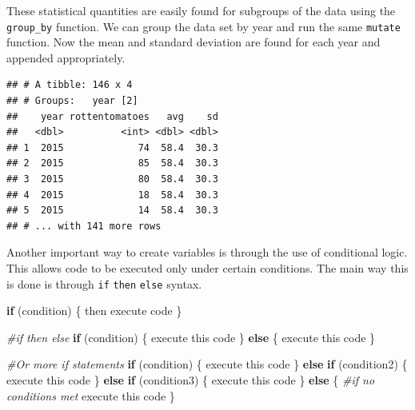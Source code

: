 \documentclass[
]{book}
\newenvironment{Shaded}{\begin{snugshade}}{\end{snugshade}}
\newcommand{\CommentTok}[1]{\textcolor[rgb]{0.56,0.35,0.01}{\textit{#1}}}
\newcommand{\ControlFlowTok}[1]{\textcolor[rgb]{0.13,0.29,0.53}{\textbf{#1}}}
\newcommand{\DataTypeTok}[1]{\textcolor[rgb]{0.13,0.29,0.53}{#1}}
\newcommand{\KeywordTok}[1]{\textcolor[rgb]{0.13,0.29,0.53}{\textbf{#1}}}
\newcommand{\NormalTok}[1]{#1}
\newcommand{\OperatorTok}[1]{\textcolor[rgb]{0.81,0.36,0.00}{\textbf{#1}}}
\newcommand{\StringTok}[1]{\textcolor[rgb]{0.31,0.60,0.02}{#1}}
\theoremstyle{definition}
\theoremstyle{definition}
\theoremstyle{definition}
\theoremstyle{remark}
\begin{document}
These statistical quantities are easily found for subgroups of the data using the \texttt{group\_by} function. We can group the data set by year and run the same \texttt{mutate} function. Now the mean and standard deviation are found for each year and appended appropriately.

\begin{Shaded}
\end{Shaded}

\begin{verbatim}
## # A tibble: 146 x 4
## # Groups:   year [2]
##    year rottentomatoes   avg    sd
##   <dbl>          <int> <dbl> <dbl>
## 1  2015             74  58.4  30.3
## 2  2015             85  58.4  30.3
## 3  2015             80  58.4  30.3
## 4  2015             18  58.4  30.3
## 5  2015             14  58.4  30.3
## # ... with 141 more rows
\end{verbatim}

Another important way to create variables is through the use of conditional logic. This allows code to be executed only under certain conditions. The main way this is done is through \texttt{if} \texttt{then} \texttt{else} syntax.

\begin{Shaded}
\begin{Highlighting}[]
\ControlFlowTok{if}\NormalTok{ (condition) \{}
\NormalTok{  then execute code}
\NormalTok{\} }

\CommentTok{#if then else}
\ControlFlowTok{if}\NormalTok{ (condition) \{}
\NormalTok{  execute this code  }
\NormalTok{\} }\ControlFlowTok{else}\NormalTok{ \{}
\NormalTok{  execute this code}
\NormalTok{\}}

\CommentTok{#Or more if statements}
\ControlFlowTok{if}\NormalTok{ (condition) \{}
\NormalTok{  execute this code  }
\NormalTok{\} }\ControlFlowTok{else} \ControlFlowTok{if}\NormalTok{ (condition2) \{}
\NormalTok{  execute this code}
\NormalTok{\} }\ControlFlowTok{else} \ControlFlowTok{if}\NormalTok{ (condition3) \{}
\NormalTok{  execute this code}
\NormalTok{\} }\ControlFlowTok{else}\NormalTok{ \{}
  \CommentTok{#if no conditions met}
\NormalTok{  execute this code}
\NormalTok{\}}
\end{Highlighting}
\end{Shaded}
\end{document}
